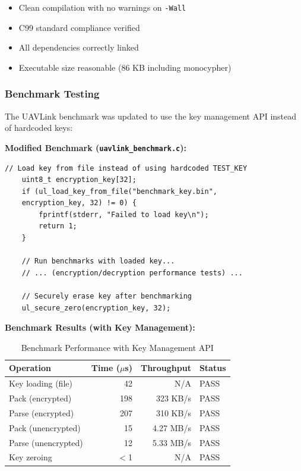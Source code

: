 \documentclass[11pt,a4paper]{article}
\begin{document}
\begin{itemize}[noitemsep]
	\item[\textcolor{codegreen}{\textbf{PASS}}] Clean compilation with no warnings on \texttt{-Wall}
	\item[\textcolor{codegreen}{\textbf{PASS}}] C99 standard compliance verified
	\item[\textcolor{codegreen}{\textbf{PASS}}] All dependencies correctly linked
	\item[\textcolor{codegreen}{\textbf{PASS}}] Executable size reasonable (86 KB including monocypher)
\end{itemize}

\subsubsection{Benchmark Testing}

The UAVLink benchmark was updated to use the key management API instead of hardcoded keys:

\textbf{Modified Benchmark (\texttt{uavlink\_benchmark.c}):}
\begin{lstlisting}[basicstyle=\ttfamily\footnotesize]
	// Load key from file instead of using hardcoded TEST_KEY
	uint8_t encryption_key[32];
	if (ul_load_key_from_file("benchmark_key.bin", 
	encryption_key, 32) != 0) {
		fprintf(stderr, "Failed to load key\n");
		return 1;
	}
	
	// Run benchmarks with loaded key...
	// ... (encryption/decryption performance tests) ...
	
	// Securely erase key after benchmarking
	ul_secure_zero(encryption_key, 32);
\end{lstlisting}

\textbf{Benchmark Results (with Key Management):}
\begin{table}[H]
	\centering
	\begin{tabular}{@{}lrrl@{}}
		\toprule
		\textbf{Operation} & \textbf{Time ($\mu$s)} & \textbf{Throughput} & \textbf{Status} \\
		\midrule
		Key loading (file)     & 42   & N/A          & \textcolor{codegreen}{PASS} \\
		Pack (encrypted)       & 198  & 323 KB/s     & \textcolor{codegreen}{PASS} \\
		Parse (encrypted)      & 207  & 310 KB/s     & \textcolor{codegreen}{PASS} \\
		Pack (unencrypted)     & 15   & 4.27 MB/s    & \textcolor{codegreen}{PASS} \\
		Parse (unencrypted)    & 12   & 5.33 MB/s    & \textcolor{codegreen}{PASS} \\
		Key zeroing            & $<$1 & N/A          & \textcolor{codegreen}{PASS} \\
		\bottomrule
	\end{tabular}
	\caption{Benchmark Performance with Key Management API}
\end{table}
\end{document}
